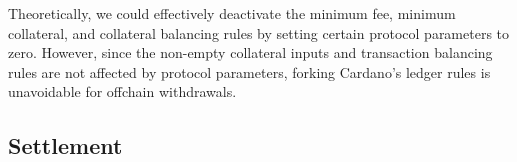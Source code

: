 \documentclass[../hydrozoa.tex]{subfiles}
\begin{document}
Theoretically, we could effectively deactivate the minimum fee, minimum collateral, and collateral balancing rules by setting certain protocol parameters to zero.
However, since the non-empty collateral inputs and transaction balancing rules are not affected by protocol parameters, forking Cardano's ledger rules is unavoidable for offchain withdrawals.

\subsection{Settlement}%
\label{h:ledger-settlement}
\end{document}
